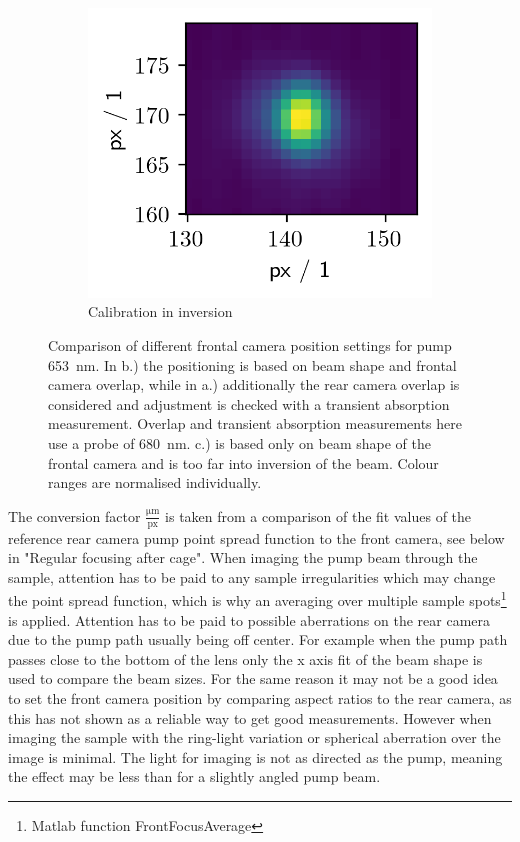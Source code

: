 \documentclass[twoside,openright,listof=numbered]{scrreprt}
\begin{document}
\begin{figure}[hbtp]
\begin{subfigure}[b]{0.32\linewidth}
\includegraphics[scale=1]{images/CalibComparison/worstComparisonCalib.png}
\caption{Calibration in inversion}
\end{subfigure}
\caption[Comparison of different frontal camera position settings for calibration process.]{Comparison of different frontal camera position settings for pump \qty{653}{\nano\meter}. In b.) the positioning is based on beam shape and frontal camera overlap, while in a.) additionally the rear camera overlap is considered and adjustment is checked with a transient absorption measurement. Overlap and transient absorption measurements here use a probe of \qty{680}{\nano\meter}. c.) is based only on beam shape of the frontal camera and is too far into inversion of the beam. Colour ranges are normalised individually.\label{fig:pumpCalibComparison}}
\end{figure}

The conversion factor $\frac{\si{\micro\meter}}{\text{px}}$ is taken from a comparison of the fit values of the reference rear camera pump point spread function to the front camera, see below in "Regular focusing after cage". When imaging the pump beam through the sample, attention has to be paid to any sample irregularities which may change the point spread function, which is why an averaging over multiple sample spots\footnote{Matlab function FrontFocusAverage} is applied. Attention has to be paid to possible aberrations on the rear camera due to the pump path usually being off center. For example when the pump path passes close to the bottom of the lens only the x axis fit of the beam shape is used to compare the beam sizes. For the same reason it may not be a good idea to set the front camera position by comparing aspect ratios to the rear camera, as this has not shown as a reliable way to get good measurements. However when imaging the sample with the ring-light variation or spherical aberration over the image is minimal. The light for imaging is not as directed as the pump, meaning the effect may be less than for a slightly angled pump beam. 
\end{document}
